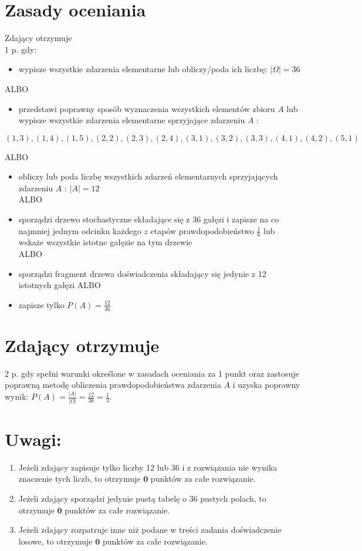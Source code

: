\documentclass[10pt]{article}
\begin{document}
\section*{Zasady oceniania}
Zdający otrzymuje\\
1 p. gdy:

\begin{itemize}
  \item wypisze wszystkie zdarzenia elementarne lub obliczy/poda ich liczbę: $|\Omega|=36$
\end{itemize}

ALBO

\begin{itemize}
  \item przedstawi poprawny sposób wyznaczenia wszystkich elementów zbioru $A$ lub wypisze wszystkie zdarzenia elementarne sprzyjające zdarzeniu $A$ :
\end{itemize}

$$
(1,3),(1,4),(1,5),(2,2),(2,3),(2,4),(3,1),(3,2),(3,3),(4,1),(4,2),(5,1)
$$

ALBO

\begin{itemize}
  \item obliczy lub poda liczbę wszystkich zdarzeń elementarnych sprzyjających zdarzeniu $A$ : $|A|=12$\\
ALBO
  \item sporządzi drzewo stochastyczne składające się z 36 gałęzi i zapisze na co najmniej jednym odcinku każdego $z$ etapów prawdopodobieństwo $\frac{1}{6}$ lub wskaże wszystkie istotne gałęzie na tym drzewie\\
ALBO
  \item sporządzi fragment drzewa doświadczenia składający się jedynie z 12 istotnych gałęzi ALBO
  \item zapisze tylko $P(A)=\frac{12}{36}$
\end{itemize}

\section*{Zdający otrzymuje}
2 p. gdy spełni warunki określone w zasadach oceniania za 1 punkt oraz zastosuje poprawną metodę obliczenia prawdopodobieństwa zdarzenia $A$ i uzyska poprawny wynik: $P(A)=\frac{|A|}{|\Omega|}=\frac{12}{36}=\frac{1}{3}$.

\section*{Uwagi:}
\begin{enumerate}
  \item Jeżeli zdający zapisuje tylko liczby 12 lub 36 i z rozwiązania nie wynika znaczenie tych liczb, to otrzymuje $\mathbf{0}$ punktów za całe rozwiązanie.
  \item Jeżeli zdający sporządzi jedynie pustą tabelę o 36 pustych polach, to otrzymuje $\mathbf{0}$ punktów za całe rozwiązanie.
  \item Jeżeli zdający rozpatruje inne niż podane w treści zadania doświadczenie losowe, to otrzymuje $\mathbf{0}$ punktów za całe rozwiązanie.
\end{enumerate}
\end{document}
